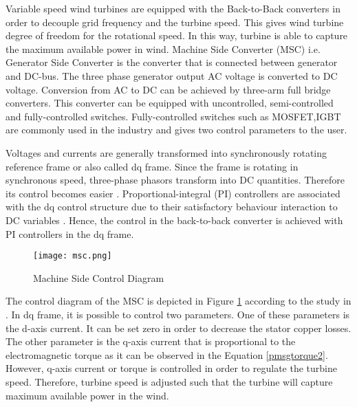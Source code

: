 Variable speed wind turbines are equipped with the Back-to-Back converters in order to decouple grid frequency and the turbine speed. This gives wind turbine degree of freedom for the rotational speed. In this way, turbine is able to capture the maximum available power in wind. Machine Side Converter (MSC) i.e. Generator Side Converter is the converter that is connected between generator and DC-bus. The three phase generator output AC voltage is converted to DC voltage.
Conversion from AC to DC can be achieved by three-arm full bridge converters. This converter can be equipped with uncontrolled, semi-controlled and fully-controlled switches. Fully-controlled switches such as MOSFET,IGBT are commonly used in the industry and gives two control parameters to the user. \par
Voltages and currents are generally transformed into synchronously rotating reference frame or also called dq frame. Since the frame is rotating in synchronous speed, three-phase phasors transform into DC quantities. Therefore its control becomes easier \cite{Kazmierkowski2002}. Proportional-integral (PI) controllers are associated with the dq control structure due to their satisfactory behaviour interaction to DC variables \cite{Blaabjerg2006a}. Hence, the control in the back-to-back converter is achieved with PI controllers in the dq frame. \par
\begin{figure}[h!]
	\centering
	\texttt{[image: msc.png]}
	\caption{Machine Side Control Diagram}
	\label{msc}
\end{figure}
The control diagram of the MSC is depicted in Figure \ref{msc} according to the study in \cite{Chinchilla2006}. In dq frame, it is possible to control two parameters. One of these parameters is the d-axis current. It can be set zero in order to decrease the stator copper losses. The other parameter is the q-axis current that is proportional to the electromagnetic torque as it can be observed in the Equation \ref{pmsgtorque2}. However, q-axis current or torque is controlled in order to regulate the turbine speed. Therefore, turbine speed is adjusted such that the turbine will capture maximum available power in the wind. 
